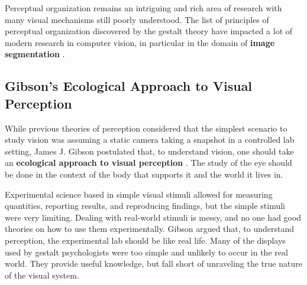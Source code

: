 
Perceptual organization remains an intriguing and rich area of research with many visual mechanisms still poorly understood. The list of principles of perceptual organization discovered by the gestalt theory have impacted a lot of modern research in computer vision, in particular in the domain of {\bf image segmentation} \cite{Malik90}.


\subsection{Gibson's Ecological Approach to Visual Perception}

While previous theories of perception considered that the simplest scenario to study vision was assuming a static camera taking a snapshot in a controlled lab setting, James J. Gibson postulated that, to understand vision, one should take an {\bf ecological approach to visual perception} \cite{Gibson1979}. The study of the eye should be done in the context of the body that supports it and the world it lives in.

Experimental science based in simple visual stimuli allowed for measuring quantities, reporting results, and reproducing findings, but the simple stimuli were very limiting. Dealing with real-world stimuli is messy, and no one had good theories on how to use them experimentally. Gibson argued that, to understand perception, the experimental lab should be like real life. Many of the displays used by gestalt psychologists were too simple and unlikely to occur in the real world. They provide useful knowledge, but fall short of unraveling the true nature of the visual system.

